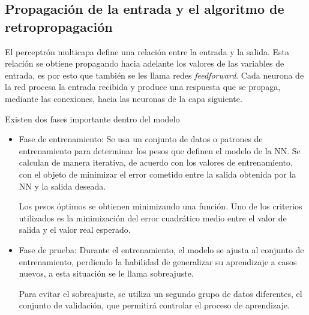 \subsection{Propagación de la entrada y el algoritmo de retropropagación}
El perceptrón multicapa define una relación entre la entrada y la salida. Esta relación se obtiene propagando hacia adelante los valores de las variables de entrada, es por esto que también se les llama redes {\em feedforward}. Cada neurona de la red procesa la entrada recibida y produce una respuesta que se propaga, mediante las conexiones, hacia las neuronas de la capa siguiente.

Existen dos fases importante dentro del modelo
\begin{itemize}
	\item Fase de entrenamiento: Se usa un conjunto de datos o patrones de entrenamiento para determinar los pesos que definen el modelo de la NN. Se calculan de manera iterativa, de acuerdo con los valores de entrenamiento, con el objeto de minimizar el error cometido entre la salida obtenida por la NN y la salida deseada.

	Los pesos óptimos se obtienen minimizando una función. Uno de los criterios utilizados es la minimización del error cuadrático medio entre el valor de salida y el valor real esperado.

	\item Fase de prueba: Durante el entrenamiento, el modelo se ajusta al conjunto de entrenamiento, perdiendo la habilidad de generalizar su aprendizaje a casos nuevos, a esta situación se le llama sobreajuste.

	Para evitar el sobreajuste, se utiliza un segundo grupo de datos diferentes, el conjunto de validación, que permitirá controlar el proceso de aprendizaje.
\end{itemize}

